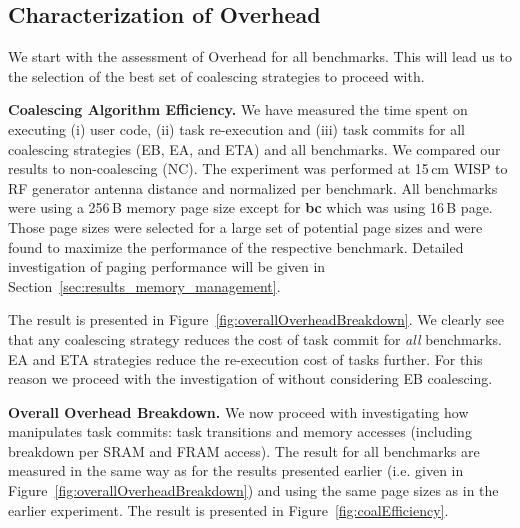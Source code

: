 
\subsection{Characterization of \sys Overhead}
\label{sec:coala_overhead}

We start with the assessment of \sys Overhead for all benchmarks. This will lead us to the selection of the best set of coalescing strategies to proceed with.

\indent \textbf{\sys Coalescing Algorithm Efficiency.} We have measured the time spent on executing (i) user code, (ii) task re-execution and (iii) task commits for all coalescing strategies (EB, EA, and ETA) and all benchmarks. We compared our results to non-coalescing \sys (NC). The experiment was performed at 15\,cm WISP to RF generator antenna distance and normalized per benchmark. All benchmarks were using a 256\,B memory page size except for \textbf{bc} which was using 16\,B page. Those page sizes were selected for a large set of potential page sizes and were found to maximize the performance of the respective benchmark. Detailed investigation of \sys paging performance will be given in Section~\ref{sec:results_memory_management}.

The result is presented in Figure~\ref{fig:overallOverheadBreakdown}. We clearly see that any \sys coalescing strategy reduces the cost of task commit for \emph{all} benchmarks. EA and ETA strategies reduce the re-execution cost of tasks further. For this reason we proceed with the investigation of \sys without considering EB coalescing.

\textbf{Overall \sys Overhead Breakdown.} We now proceed with investigating how \sys manipulates task commits: task transitions and memory accesses (including breakdown per SRAM and FRAM access). The result for all benchmarks are measured in the same way as for the results presented earlier (i.e. given in Figure~\ref{fig:overallOverheadBreakdown}) and using the same page sizes as in the earlier experiment. The result is presented in Figure~\ref{fig:coalEfficiency}.


